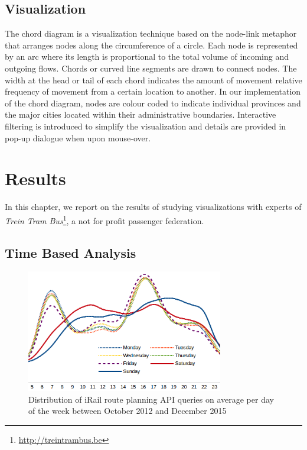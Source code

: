\documentclass{sig-alternate}
\newcommand{\todo}[1]{\noindent\textcolor{red}{{\bf \{TODO}: #1{\bf \}}}}
\begin{document}
\subsection{Visualization}
The chord diagram is a visualization technique based on the node-link metaphor that arranges nodes along the circumference of a circle. 
Each node is represented by an arc where its length is proportional to the total volume of incoming and outgoing flows. 
Chords or curved line segments are drawn to connect nodes. 
The width at the head or tail of each chord indicates the amount of movement relative frequency of movement from a certain location to another.
In our implementation of the chord diagram, nodes are colour coded to indicate individual provinces and the major cities located within their administrative boundaries. 
Interactive filtering is introduced to simplify the visualization and details are provided in pop-up dialogue when upon mouse-over.

\section{Results}
\label{sec:results}

In this chapter, we report on the results of studying visualizations with experts of \emph{Trein Tram Bus}\footnote{\url{http://treintrambus.be}}, a not for profit passenger federation.

\subsection{Time Based Analysis}
\begin{figure}[h]
\centering
\includegraphics[width=8.6cm]{avg-all}
\caption{Distribution of iRail route planning API queries on average per day of the week between October 2012 and December 2015}
\label{fig:average}
\end{figure}
\end{document}
